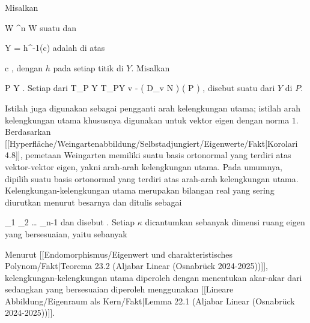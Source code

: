{}
{

Misalkan

\mavergleichskette
{\vergleichskette
{ W
}
{ \subseteq }{ \R^n
}
{  }{
}
{    }{
}
{   }{
}
}
{}{}{}
 { W } { \R
} {}
suatu
dan

\mavergleichskette
{\vergleichskette
{ Y
}
{ = }{ h^{-1}(c)
}
{  }{
}
{    }{
}
{   }{
}
}
{}{}{}
adalah
di atas

\mavergleichskette
{\vergleichskette
{ c
}
{ \in }{ \R
}
{  }{
}
{    }{
}
{   }{
}
}
{}{}{,}
dengan $h$
pada setiap titik di $Y$. Misalkan

\mavergleichskette
{\vergleichskette
{ P
}
{ \in }{ Y
}
{  }{
}
{    }{
}
{   }{
}
}
{}{}{.}
Setiap
dari
 {T_P Y} { T_PY
} { v } { - \left(  D_{v}  N   \right) \left(   P  \right)
} {,}
disebut suatu
dari $Y$ di $P$.

}

Istilah  {} juga digunakan sebagai pengganti arah kelengkungan utama; istilah arah kelengkungan utama khususnya digunakan untuk vektor eigen dengan norma $1$. Berdasarkan
[[Hyperfläche/Weingartenabbildung/Selbstadjungiert/Eigenwerte/Fakt|Korolari 4.8]],
pemetaan Weingarten memiliki suatu basis ortonormal yang terdiri atas vektor-vektor eigen, yakni arah-arah kelengkungan utama. Pada umumnya, dipilih suatu basis ortonormal yang terdiri atas arah-arah kelengkungan utama. Kelengkungan-kelengkungan utama merupakan bilangan real yang sering diurutkan menurut besarnya dan ditulis sebagai

\mavergleichskettedisp
{\vergleichskette
{ \kappa_1
}
{ \leq} { \kappa_2
}
{ \leq   \ldots \leq} { \kappa_{n-1}
}
{ } {
}
{ } {
}
}
{}{}{}
dan disebut  {.} Setiap $\kappa$ dicantumkan sebanyak dimensi ruang eigen yang bersesuaian, yaitu sebanyak

Menurut
[[Endomorphismus/Eigenwert und charakteristisches Polynom/Fakt|Teorema 23.2 (Aljabar Linear (Osnabrück 2024-2025))]],
kelengkungan-kelengkungan utama diperoleh dengan menentukan akar-akar
dari
sedangkan
yang bersesuaian diperoleh menggunakan
[[Lineare Abbildung/Eigenraum als Kern/Fakt|Lemma 22.1 (Aljabar Linear (Osnabrück 2024-2025))]].

